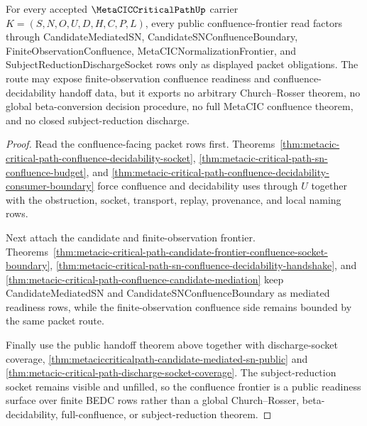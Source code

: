 \begin{theorem}
\label{thm:metaciccriticalpath-confluence-frontier-public}
For every accepted $\MetaCICCriticalPathUp$ carrier $K=(S,N,O,U,D,H,C,P,L)$, every public confluence-frontier read factors through CandidateMediatedSN, CandidateSNConfluenceBoundary, FiniteObservationConfluence, MetaCICNormalizationFrontier, and SubjectReductionDischargeSocket rows only as displayed packet obligations. The route may expose finite-observation confluence readiness and confluence-decidability handoff data, but it exports no arbitrary Church--Rosser theorem, no global beta-conversion decision procedure, no full MetaCIC confluence theorem, and no closed subject-reduction discharge.
\end{theorem}
\begin{proof}
Read the confluence-facing packet rows first. Theorems~\ref{thm:metacic-critical-path-confluence-decidability-socket}, \ref{thm:metacic-critical-path-sn-confluence-budget}, and \ref{thm:metacic-critical-path-confluence-decidability-consumer-boundary} force confluence and decidability uses through $U$ together with the obstruction, socket, transport, replay, provenance, and local naming rows.

Next attach the candidate and finite-observation frontier. Theorems~\ref{thm:metacic-critical-path-candidate-frontier-confluence-socket-boundary}, \ref{thm:metacic-critical-path-sn-confluence-decidability-handshake}, and \ref{thm:metacic-critical-path-confluence-candidate-mediation} keep CandidateMediatedSN and CandidateSNConfluenceBoundary as mediated readiness rows, while the finite-observation confluence side remains bounded by the same packet route.

Finally use the public handoff theorem above together with discharge-socket coverage, \autoref{thm:metaciccriticalpath-candidate-mediated-sn-public} and \autoref{thm:metacic-critical-path-discharge-socket-coverage}. The subject-reduction socket remains visible and unfilled, so the confluence frontier is a public readiness surface over finite BEDC rows rather than a global Church--Rosser, beta-decidability, full-confluence, or subject-reduction theorem.
\end{proof}

